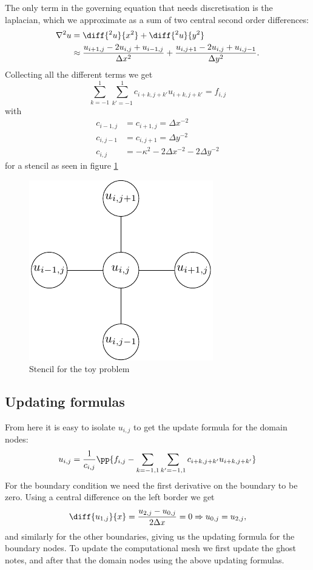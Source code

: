 \documentclass[sigconf]{acmart}
\begin{document}
The only term in the governing equation that needs discretisation is the laplacian, which we approximate as a sum of two central second order differences:
\begin{align}
	\nabla^2 u &= \diff{^2 u}{x^2} + \diff{^2 u}{y^2} \\
	&\approx \frac{u_{i+1, j} - 2 u_{i,j} + u_{i-1,j}}{\Delta x^2} + \frac{u_{i, j+1} - 2 u_{i,j} + u_{i,j-1}}{\Delta y^2}.
\end{align}
Collecting all the different terms we get
\begin{equation}\label{key}
	\sum_{k = -1}^{1} \sum_{k' = -1}^{1} c_{i+k, j+k'} u_{i+k, j+k'} = f_{i,j}
\end{equation}
with
\begin{align}\label{key}
	c_{i-1,j} &= c_{i+1, j} = \Delta x^{-2} \\
	c_{i,j-1} &= c_{i, j+1} = \Delta y^{-2} \\
	c_{i,j} &= -\kappa^2 - 2\Delta x^{-2} - 2\Delta y^{-2}
\end{align}
for a stencil as seen in figure \ref{fig:stencil2}
\begin{figure}
	\centering
	\includegraphics{stencil.pdf}
	\caption{Stencil for the toy problem}
	\label{fig:stencil2}
\end{figure}

\subsection{Updating formulas}
From here it is easy to isolate $ u_{i,j} $ to get the update formula for the domain nodes:
\begin{equation}\label{key}
	u_{i,j}  = \frac{1}{c_{i,j}} \pp{f_{i,j} - \sum_{k = -1, 1}\sum_{k' = -1, 1} c_{i+k, j+k'} u_{i+k, j+k'}}
\end{equation}
For the boundary condition we need the first derivative on the boundary to be zero. Using a central difference on the left border we get
\begin{equation}\label{key}
\diff{u_{1,j}}{x} =\frac{u_{2,j} - u_{0,j}}{2\Delta x} = 0 \Rightarrow u_{0,j} = u_{2,j},
\end{equation}
and similarly for the other boundaries, giving us the updating formula for the boundary nodes. To update the computational mesh we first update the ghost notes, and after that the domain nodes using the above updating formulas.
\end{document}
